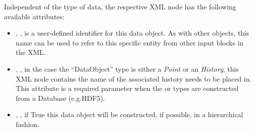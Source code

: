 Independent of the type of data, the respective XML node has the following
available attributes:
\vspace{-5mm}
\begin{itemize}
  \itemsep0em
  \item {}, , is a user-defined
  identifier for this data object.
  \nb As with other objects, this name can be used to refer to this specific
  entity from other input blocks in the XML.

  \item {}, , in the case  the
   ``DataObject'' type is either a \textit{Point} or an
  \textit{History}, this XML node contains the name of the associated history needs to be placed in.
  \\\nb This attribute is a required parameter when the   or 
   types are constructed from a Database (e.g.HDF5).

  \item {}, , if True
  this data object will be constructed, if possible, in a hierarchical fashion.
\end{itemize}
